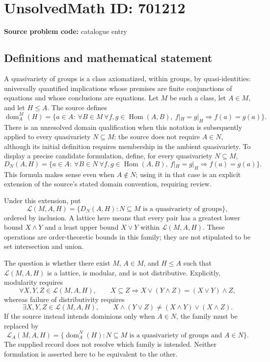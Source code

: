 \documentclass[11pt]{article}
\begin{document}
\section*{UnsolvedMath ID: 701212}
\textbf{Source problem code:} catalogue entry
\subsection{Definitions and mathematical statement}
A quasivariety of groups is a class axiomatized, within groups, by quasi-identities: universally quantified implications whose premises are finite conjunctions of equations and whose conclusions are equations. Let \(M\) be such a class, let \(A\in M\), and let \(H\leq A\). The source defines
\[
\operatorname{dom}^{M}_{A}(H)=\{a\in A:\ \forall B\in M\ \forall f,g\in\operatorname{Hom}(A,B),\ f|_H=g|_H\Longrightarrow f(a)=g(a)\}.
\]
There is an unresolved domain qualification when this notation is subsequently applied to every quasivariety \(N\subseteq M\): the source does not require \(A\in N\), although its initial definition requires membership in the ambient quasivariety. To display a precise candidate formulation, define, for every quasivariety \(N\subseteq M\),
\[
D_N(A,H)=\{a\in A:\ \forall B\in N\ \forall f,g\in\operatorname{Hom}(A,B),\ f|_H=g|_H\Longrightarrow f(a)=g(a)\}.
\]
This formula makes sense even when \(A\notin N\); using it in that case is an explicit extension of the source's stated domain convention, requiring review.

Under this extension, put
\[
\mathcal L(M,A,H)=\{D_N(A,H):N\subseteq M\text{ is a quasivariety of groups}\},
\]
ordered by inclusion. A lattice here means that every pair has a greatest lower bound \(X\wedge Y\) and a least upper bound \(X\vee Y\) within \(\mathcal L(M,A,H)\). These operations are order-theoretic bounds in this family; they are not stipulated to be set intersection and union.

The question is whether there exist \(M\), \(A\in M\), and \(H\leq A\) such that \(\mathcal L(M,A,H)\) is a lattice, is modular, and is not distributive. Explicitly, modularity requires
\[
\forall X,Y,Z\in\mathcal L(M,A,H),\qquad
X\subseteq Z\Longrightarrow X\vee(Y\wedge Z)=(X\vee Y)\wedge Z,
\]
whereas failure of distributivity requires
\[
\exists X,Y,Z\in\mathcal L(M,A,H),\qquad
X\wedge(Y\vee Z)\ne (X\wedge Y)\vee(X\wedge Z).
\]
If the source instead intends dominions only when \(A\in N\), the family must be replaced by
\[
\mathcal L_A(M,A,H)=\{\operatorname{dom}^{N}_{A}(H):N\subseteq M\text{ is a quasivariety of groups and }A\in N\}.
\]
The supplied record does not resolve which family is intended. Neither formulation is asserted here to be equivalent to the other.
\end{document}
